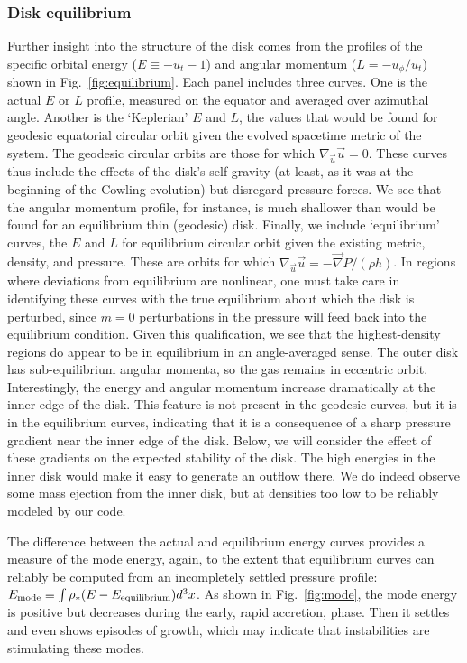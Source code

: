 \subsubsection{Disk equilibrium}

Further insight into the structure of the disk comes from the profiles
of the specific orbital energy ($E\equiv-u_t-1$) and angular momentum
($L=-u_{\phi}/u_{t}$) shown in Fig.~\ref{fig:equilibrium}.  Each panel
includes three curves.  One is the actual $E$ or $L$ profile, measured
on the equator and averaged over azimuthal angle.  Another is the
`Keplerian' $E$ and $L$, the values that would be found for geodesic
equatorial circular orbit given the evolved spacetime metric of the
system.  The geodesic circular orbits are those for which
$\nabla_{\vec{u}}\vec{u}=0$.  These curves thus include the effects of
the disk's self-gravity (at least, as it was at the beginning of the
Cowling evolution) but disregard pressure forces.  We see that the angular
momentum profile, for instance, is much shallower than would be found
for an equilibrium thin (geodesic) disk.  Finally, we include
`equilibrium' curves, the $E$ and $L$ for equilibrium circular
orbit given the existing metric, density, and pressure.  These
are orbits for which $\nabla_{\vec{u}}\vec{u}=-\vec{\nabla}P/(\rho h)$. 
In regions
where deviations from equilibrium are nonlinear, one must take care
in identifying these curves with the true equilibrium about which the
disk is perturbed, since $m=0$ perturbations in the pressure will
feed back into the equilibrium condition.  Given this qualification,
we see that the highest-density regions do appear to be in equilibrium
in an angle-averaged sense.  The outer disk has sub-equilibrium
angular momenta, so the gas remains in eccentric orbit.  Interestingly,
the energy and angular momentum increase dramatically at the inner
edge of the disk.  This feature is not present in the geodesic curves,
but it is in the equilibrium curves, indicating that it is a consequence
of a sharp pressure gradient near the inner edge of the disk.  Below,
we will consider the effect of these gradients on the expected stability
of the disk.  The high
energies in the inner disk would make it easy to generate an outflow there. 
We do indeed observe some mass ejection from the inner disk, but at densities
too low to be reliably modeled by our code.

The difference between the actual and equilibrium energy curves provides a
measure of the mode energy, again, to the extent that equilibrium curves
can reliably be computed from an incompletely settled pressure profile: 
$E_{\rm mode}\equiv \int \rho_*(E-E_{\rm equilibrium})d^3x$.  As shown in
Fig.~\ref{fig:mode},
the mode energy
is positive but decreases during the early, rapid accretion, phase.  Then
it settles and even shows episodes of growth, which may indicate that
instabilities are stimulating these modes.

